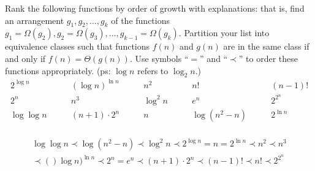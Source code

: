 \begin{exercise}[]{Rank the following functions by order of growth with explanations: that is, find an arrangement $g_1, g_2, \ldots , g_{k}$ of the functions $g_1 = \Omega(g_2), g_2 = \Omega(g_3), \ldots, g_{k-1} = \Omega(g_{k})$.  Partition your list into equivalence classes such that functions $f(n)$ and $g(n)$ are in the same class if and only if $f(n) = \Theta(g(n))$. Use symbols ``$=$'' and ``$\prec$'' to order these functions appropriately. (ps: $\log n$ refers to $\log_2 n$.)$$
  \begin{array}{ccccc}
      2^{\log n} \quad & \quad (\log n)^{\ln n} \quad & \quad n^2 \quad & \quad n! \quad & \quad (n - 1)! \\
      2^n \quad & \quad n^3 \quad & \quad \log^2 n \quad & \quad e^n \quad & \quad 2^{2^n} \\
      \log\log n \quad & \quad (n+1)\cdot 2^n \quad & \quad n \quad & \quad \log {(n^2 - n)} \quad & \quad 2^{\ln n} \\
  \end{array}
  $$}
  \begin{solution}
  \begin{equation}
    \begin{aligned}
      \log\log n  \prec \log {(n^2 - n)} \prec \log^2 n \prec 2^{\log n} = n = 2^{\ln n}  \prec n^2 \prec n^3 \\ 
      \prec ()\log n)^{\ln n} \prec 2^n = e^n \prec (n+1)\cdot 2^n \prec  (n-1)! \prec n! \prec  2^{2^n} 
    \end{aligned}
  \end{equation}
  \end{solution}
  \label{ex6}
\end{exercise}

